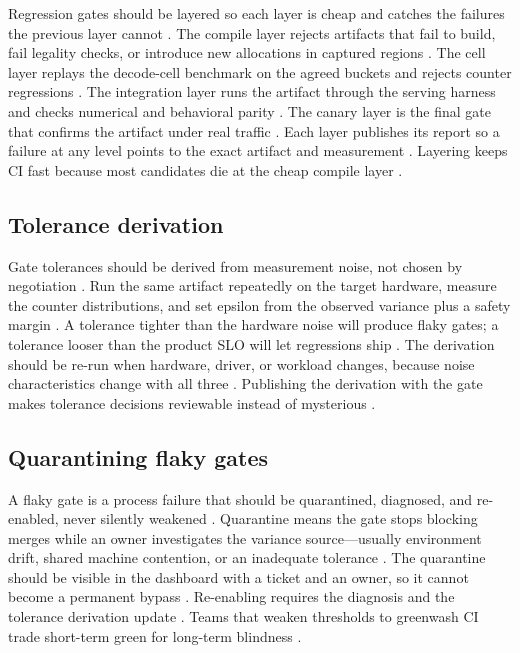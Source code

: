 Regression gates should be layered so each layer is cheap and catches the failures the previous layer cannot \citep{chen2020compilerbasedhardw,memoryfloor2026,taxbreak2026}. The compile layer rejects artifacts that fail to build, fail legality checks, or introduce new allocations in captured regions \citep{nvidia2024cudagraphs,amd2024aie}. The cell layer replays the decode-cell benchmark on the agreed buckets and rejects counter regressions \citep{patel2025llminference,memoryfloor2026}. The integration layer runs the artifact through the serving harness and checks numerical and behavioral parity \citep{chen2020compilerbasedhardw,patel2025llminference}. The canary layer is the final gate that confirms the artifact under real traffic \citep{kwon2023vllm,taxbreak2026}. Each layer publishes its report so a failure at any level points to the exact artifact and measurement \citep{memoryfloor2026,patel2025llminference}. Layering keeps CI fast because most candidates die at the cheap compile layer \citep{chen2020compilerbasedhardw,taxbreak2026}.

\subsection{Tolerance derivation}

Gate tolerances should be derived from measurement noise, not chosen by negotiation \citep{patel2025llminference,memoryfloor2026,chen2020compilerbasedhardw}. Run the same artifact repeatedly on the target hardware, measure the counter distributions, and set epsilon from the observed variance plus a safety margin \citep{taxbreak2026,memoryfloor2026}. A tolerance tighter than the hardware noise will produce flaky gates; a tolerance looser than the product SLO will let regressions ship \citep{chen2020compilerbasedhardw,patel2025llminference}. The derivation should be re-run when hardware, driver, or workload changes, because noise characteristics change with all three \citep{memoryfloor2026,taxbreak2026}. Publishing the derivation with the gate makes tolerance decisions reviewable instead of mysterious \citep{patel2025llminference,memoryfloor2026}.

\subsection{Quarantining flaky gates}

A flaky gate is a process failure that should be quarantined, diagnosed, and re-enabled, never silently weakened \citep{memoryfloor2026,chen2020compilerbasedhardw,patel2025llminference}. Quarantine means the gate stops blocking merges while an owner investigates the variance source—usually environment drift, shared machine contention, or an inadequate tolerance \citep{taxbreak2026,memoryfloor2026}. The quarantine should be visible in the dashboard with a ticket and an owner, so it cannot become a permanent bypass \citep{chen2020compilerbasedhardw,patel2025llminference}. Re-enabling requires the diagnosis and the tolerance derivation update \citep{memoryfloor2026,taxbreak2026}. Teams that weaken thresholds to greenwash CI trade short-term green for long-term blindness \citep{patel2025llminference,memoryfloor2026}.

